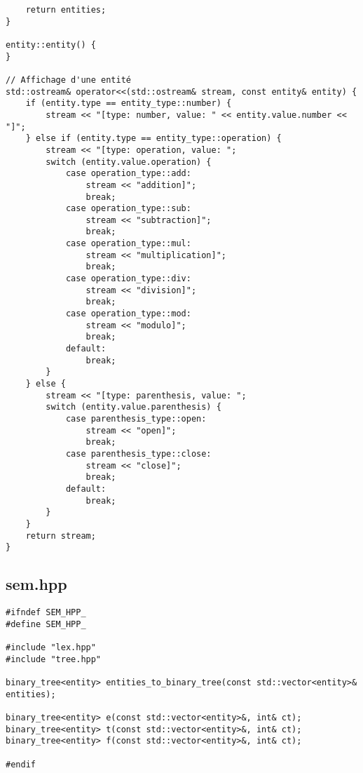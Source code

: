 \begin{verbatim}
    return entities;
}

entity::entity() {
}

// Affichage d'une entité
std::ostream& operator<<(std::ostream& stream, const entity& entity) {
    if (entity.type == entity_type::number) {
        stream << "[type: number, value: " << entity.value.number << "]";
    } else if (entity.type == entity_type::operation) {
        stream << "[type: operation, value: ";
        switch (entity.value.operation) {
            case operation_type::add:
                stream << "addition]";
                break;
            case operation_type::sub:
                stream << "subtraction]";
                break;
            case operation_type::mul:
                stream << "multiplication]";
                break;
            case operation_type::div:
                stream << "division]";
                break;
            case operation_type::mod:
                stream << "modulo]";
                break;
            default:
                break;
        }
    } else {
        stream << "[type: parenthesis, value: ";
        switch (entity.value.parenthesis) {
            case parenthesis_type::open:
                stream << "open]";
                break;
            case parenthesis_type::close:
                stream << "close]";
                break;
            default:
                break;
        }
    }
    return stream;
}
\end{verbatim}

\subsection{sem.hpp}
\begin{verbatim}
#ifndef SEM_HPP_
#define SEM_HPP_

#include "lex.hpp"
#include "tree.hpp"

binary_tree<entity> entities_to_binary_tree(const std::vector<entity>& entities);

binary_tree<entity> e(const std::vector<entity>&, int& ct);
binary_tree<entity> t(const std::vector<entity>&, int& ct);
binary_tree<entity> f(const std::vector<entity>&, int& ct);

#endif
\end{verbatim}

